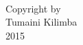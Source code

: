 \begin{vcentrepage}

\pagestyle{plain}

\mbox{}\\
\begin{center}
\noindent Copyright \textcopyright{} by \\
Tumaini Kilimba \\
2015
\end{center}


\end{vcentrepage}














